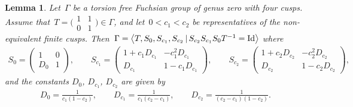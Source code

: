 \documentclass[pdftex]{sigma}
\numberwithin{equation}{section}
\newtheorem{Lemma}[Theorem]{Lemma}
\begin{document}
\begin{Lemma}\label{thm:rep}
Let~$\Gamma$ be a torsion free Fuchsian group of genus zero with four cusps. Assume that~$T=\bigr(\begin{smallmatrix}1 & 1 \\0 & 1\end{smallmatrix}\bigr)\in\Gamma$, and let~$0<c_1<c_2$ be representatives of the non-equivalent finite cusps. Then~$\Gamma=\big\langle T,S_0,S_{c_1},S_{c_2}\,|\,S_{c_2}S_{c_1}S_0T^{-1}={\rm Id}\big\rangle$ where
\begin{gather*}
S_0 =\begin{pmatrix}
1 & 0 \\
D_0 & 1
\end{pmatrix},\qquad \!
S_{c_1} =\begin{pmatrix}
1+c_1D_{c_1} & -c_1^2D_{c_1} \\
D_{c_1} & 1-c_1D_{c_1}
\end{pmatrix},\qquad\!
S_{c_2} =\begin{pmatrix}
1+c_2D_{c_2} & -c_2^2D_{c_2} \\
D_{c_2} & 1-c_2D_{c_2}
\end{pmatrix},
\end{gather*}
and the constants $D_0$, $D_{c_1}$, $D_{c_2}$ are given by
\begin{gather}\label{eqn:Di}
D_0=\frac{1}{c_1(1-c_2)},\qquad D_{c_1}=\frac{1}{c_1(c_2-c_1)},\qquad D_{c_2} =\frac{1}{(c_2-c_1)(1-c_2)} .
\end{gather}
\end{Lemma}
\end{document}

